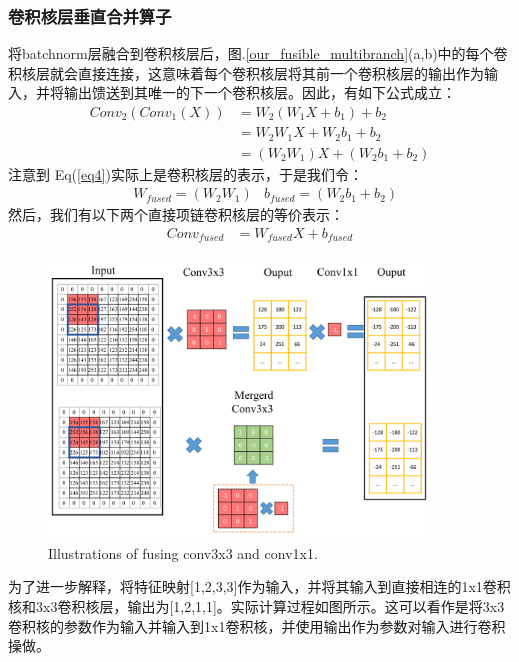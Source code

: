 \subsubsection{卷积核层垂直合并算子}
\label{sub2}
将batchnorm层融合到卷积核层后，图.\ref{our_fusible_multibranch}(a,b)中的每个卷积核层就会直接连接，这意味着每个卷积核层将其前一个卷积核层的输出作为输入，并将输出馈送到其唯一的下一个卷积核层。因此，有如下公式成立：
\begin{equation}
\begin{aligned}
Conv_2(Conv_1(X)) &= W_2(W_1X+b_1) + b_2 \\
&= W_2W_1X + W_2b_1 + b_2 \\
&= (W_2W_1)X + (W_2b_1 + b_2)
\end{aligned}
\label{eq4}
\end{equation} 
注意到 Eq(\ref{eq4})实际上是卷积核层的表示，于是我们令：
\begin{equation}
\begin{aligned}
&W_{fused} = (W_2W_1) &b_{fused} = (W_2b_1 + b_2)
\end{aligned}
\end{equation}
然后，我们有以下两个直接项链卷积核层的等价表示：
\begin{equation}
\begin{aligned}
Conv_{fused} &= W_{fused}X + b_{fused}
\end{aligned}
\end{equation} 

\begin{figure}[h]
	\centering
	\includegraphics[width=0.9\textwidth]{figures/Jresnet/FIG5_TII-21-2604.pdf}
	\caption{Illustrations of fusing conv3x3 and conv1x1.}
	\label{fuse_131}
\end{figure}
为了进一步解释，将特征映射[1,2,3,3]作为输入，并将其输入到直接相连的1x1卷积核和3x3卷积核层，输出为[1,2,1,1]。实际计算过程如图所示。这可以看作是将3x3卷积核的参数作为输入并输入到1x1卷积核，并使用输出作为参数对输入进行卷积操做。

